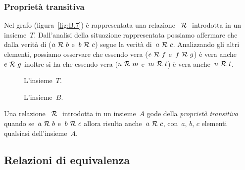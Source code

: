 
\subsubsection{Proprietà transitiva}

 \begin{esempio}

Nel grafo (figura~\ref{fig:B.7}) è rappresentata una relazione~\(~\mathcal{R}~\) 
introdotta 
in un insieme~\(T\). Dall'analisi della situazione rappresentata possiamo
affermare che dalla verità di (\(a ~\mathcal{R}~ b\) e~\(b ~\mathcal{R}~ c\)) segue la verità 
di~\(a 
~\mathcal{R}~ c\). Analizzando gli altri elementi, 
possiamo osservare che essendo vera (\(e ~\mathcal{R}~ f\) e~\(f ~\mathcal{R}~ g\)) è vera 
anche~\(e 
~\mathcal{R}~ g\)
inoltre si ha che essendo vera (\(n ~\mathcal{R}~ m\) e~\(m ~\mathcal{R}~ t\)) è vera 
anche~\(n 
~\mathcal{R}~ 
t\).
 \end{esempio}

\begin{inaccessibleblock}
 \begin{figure}[t]
\begin{minipage}[b]{.45\textwidth}
 \centering
 
 \caption{L'insieme~\(T\).}\label{fig:B.7}
\end{minipage}\hfil
\begin{minipage}[b]{.45\textwidth}
 \centering
 
 \caption{L'insieme~\(B\).}\label{fig:B.8}
\end{minipage}


\end{figure}
\end{inaccessibleblock}

\begin{definizione}
Una relazione~\(~\mathcal{R}~\) introdotta in un insieme~\(A\) gode della 
\emph{proprietà 
transitiva} quando se~\(a ~\mathcal{R}~ b\) e~\(b ~\mathcal{R}~ c\)
allora risulta anche~\(a ~\mathcal{R}~ c\), con~\(a\), \(b\), \(c\) elementi 
qualsiasi 
dell'insieme~\(A\).
\end{definizione}


\subsection{Relazioni di equivalenza}
\label{subsec:rel_equivalenza}

